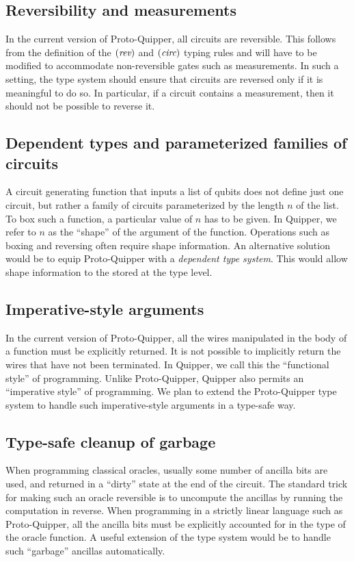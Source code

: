 \documentclass[twoside]{article}
\begin{document}
\subsection{Reversibility and measurements}

In the current version of Proto-Quipper, all circuits are
reversible. This follows from the definition of the $(\mathop{\textit{rev}}\nolimits)$ and
$(\textit{circ})$ typing rules and will have to be modified to
accommodate non-reversible gates such as measurements. In such a
setting, the type system should ensure that circuits are reversed only
if it is meaningful to do so. In particular, if a circuit contains a
measurement, then it should not be possible to reverse it.

\subsection{Dependent types and parameterized families of circuits}
 
A circuit generating function that inputs a list of qubits does not
define just one circuit, but rather a family of circuits parameterized
by the length $n$ of the list.  To box such a function, a particular
value of $n$ has to be given. In Quipper, we refer to $n$ as the
``shape'' of the argument of the function. Operations such as boxing
and reversing often require shape information. An alternative solution
would be to equip Proto-Quipper with a {\em dependent type
  system}. This would allow shape information to the stored at the
type level.

\subsection{Imperative-style arguments}

In the current version of Proto-Quipper, all the wires manipulated in
the body of a function must be explicitly returned. It is not possible
to implicitly return the wires that have not been terminated. In
Quipper, we call this the ``functional style'' of programming. Unlike
Proto-Quipper, Quipper also permits an ``imperative style'' of
programming. We plan to extend the Proto-Quipper type system to handle
such imperative-style arguments in a type-safe way.

\subsection{Type-safe cleanup of garbage}

When programming classical oracles, usually some number of ancilla
bits are used, and returned in a ``dirty'' state at the end of the
circuit. The standard trick for making such an oracle reversible is to
uncompute the ancillas by running the computation in reverse. When
programming in a strictly linear language such as Proto-Quipper, all
the ancilla bits must be explicitly accounted for in the type of the
oracle function. A useful extension of the type system would be to
handle such ``garbage'' ancillas automatically.
\end{document}
